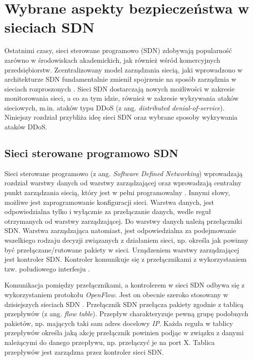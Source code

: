 \chapter{Wybrane aspekty bezpieczeństwa w sieciach SDN }

Ostatnimi czasy, sieci sterowane programowo (SDN) zdobywają popularność zarówno
w środowiskach akademickich, jak również wśród komercyjnych przedsiębiorstw.
Zcentralizowany model zarządzania siecią, jaki wprowadzono w architekturze SDN
fundamentalnie zmienił spojrzenie na sposób zarządznia w sieciach rozproszonych
\cite{ddosNYarticle}. Sieci SDN dostarczają nowych możliwości w zakresie
monitorowania sieci, a co za tym idzie, również w zakresie wykrywania ataków
sieciowych, m.in. ataków typu DDoS (z ang. \textit{distributed
  denial-of-service}). Niniejszy rozdział przybliża ideę sieci SDN oraz wybrane
sposoby wykrywania ataków DDoS. 

\section{Sieci sterowane programowo SDN}
Sieci sterowane programowo (z ang. \textit{Software Defined Networking})
wprowadzają rozdział warstwy danych od warstwy zarządzającej oraz wprowadzają
centralny punkt zarządzania siecią, który jest w pełni programowalny \cite{onf}.
Innymi słowy, możliwe jest zaprogramowanie konfiguracji sieci. Warstwa danych,
jest odpowiedzialna tylko i wyłącznie za przełączanie danych, wedle reguł
otrzymanych od warstwy zarządzającej. Do warstwy danych należą przełączniki SDN.
Warstwa zarządzająca natomiast, jest odpowiedzialna za podejmowanie wszelkiego
rodzaju decyzji związanych z działaniem sieci, np. określa jak powinny być
przełączane/rutowane pakiety w sieci. Urządzeniem warstwy zarządzającej jest
kontroler SDN. Kontroler komunikuje się z przełącznikami z wykorzystaniem tzw.
połudiowego interfesju \cite{sdninterfaces}.

Komunikacja pomiędzy przełącznikami, a kontrolerem w sieci SDN odbywa się z
wykorzystaniem protokołu \textit{OpenFlow}. Jest on obecnie szeroko stosowany w
dzisiejszych sieciach SDN \cite{ddoskoreaarticle}. Przełącznik SDN przełącza
pakiety zgodnie z tablicą przepływów (z ang. \textit{flow table}). Przepływ
charakteryzuje pewną grupę podobnych pakietów, np. mających taki sam adres
docelowy \textit{IP}. Każda reguła w tablicy przepływów określa jaką akcję
przełącznik powinien podjąc w związku z danymi należącymi do danego
przepływu, np. przełączyć je na port X. Tablica przepływów jest zarządzna przez
kontroler sieci SDN.

